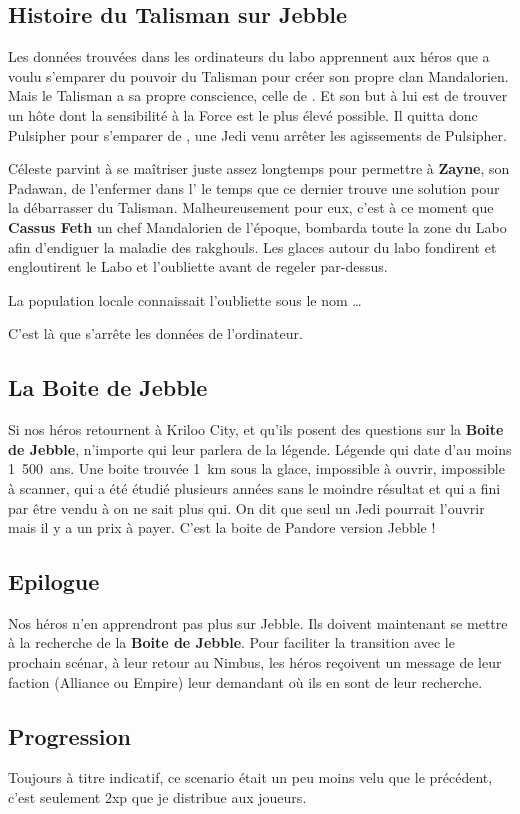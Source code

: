 \subsection{Histoire du Talisman sur Jebble}\label{sec:talisman-jebble}
Les données trouvées dans les ordinateurs du labo apprennent aux héros que  a voulu s’emparer du pouvoir du Talisman pour créer son propre clan Mandalorien. Mais le Talisman a sa propre conscience, celle de . Et son but à lui est de trouver un hôte dont la sensibilité à la Force est le plus élevé possible. Il quitta donc Pulsipher pour s’emparer de , une Jedi venu arrêter les agissements de Pulsipher.

Céleste parvint à se maîtriser juste assez longtemps pour permettre à \textbf{Zayne}, son Padawan, de l’enfermer dans l’ le temps que ce dernier trouve une solution pour la débarrasser du Talisman. Malheureusement pour eux, c’est à ce moment que \textbf{Cassus Feth} un chef Mandalorien de l’époque, bombarda toute la zone du Labo afin d’endiguer la maladie des rakghouls. Les glaces autour du labo fondirent et engloutirent le Labo et l’oubliette avant de regeler par-dessus.

La population locale connaissait l’oubliette sous le nom \ldots 

C’est là que s’arrête les données de l’ordinateur.

\subsection{La Boite de Jebble}\label{sec:boite-de-jebble}
Si nos héros retournent à Kriloo City, et qu’ils posent des questions sur la \textbf{Boite de Jebble}, n’importe qui leur parlera de la légende. Légende qui date d’au moins 1~500~ans. Une boite trouvée 1~km sous la glace, impossible à ouvrir, impossible à scanner, qui a été étudié plusieurs années sans le moindre résultat et qui a fini par être vendu à on ne sait plus qui. On dit que seul un Jedi pourrait l’ouvrir mais il y a un prix à payer. C’est la boite de Pandore version Jebble !

\subsection{\’Epilogue}
Nos héros n’en apprendront pas plus sur Jebble. Ils doivent maintenant se mettre à la recherche de la \textbf{Boite de Jebble}. Pour faciliter la transition avec le prochain scénar, à leur retour au Nimbus, les héros reçoivent un message de leur faction (Alliance ou Empire) leur demandant où ils en sont de leur recherche.

\subsection{Progression}
Toujours à titre indicatif, ce scenario était un peu moins velu que le précédent, c’est seulement 2xp que je distribue aux joueurs.

